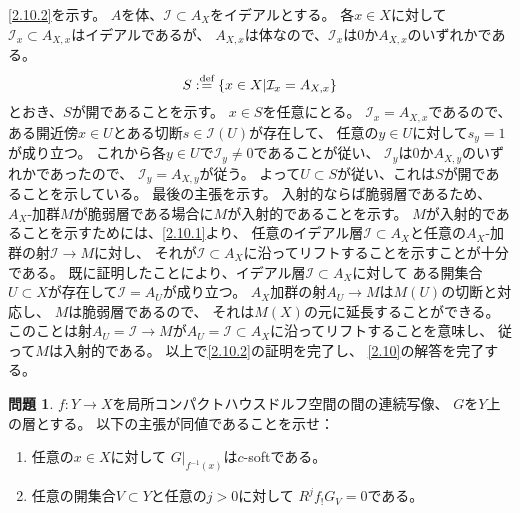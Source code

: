 \documentclass[uplatex,dvipdfmx]{jsarticle}
\makeatletter
\theoremstyle{definition}
\newtheorem{prob}[prob]{問題}
\renewenvironment{proof}[1][\proofname]{
  \pushQED{\qed}%
  \normalfont \topsep6\p@\@plus6\p@\relax
  \trivlist
  \item[\hskip\labelsep
    #1\@addpunct{\textbf{.}}]\ignorespaces
}{%
  \popQED\endtrivlist\@endpefalse
}
\providecommand{\proofname}{証明}
\newcommand\mcI{\mathcal{I}}
\def\dfn{:\overset{\mbox{{\scriptsize def}}}{=}}
\makeatother
\begin{document}
\begin{proof}
  \ref{2.10.2}を示す。
  \(A\)を体、\(\mcI\subset A_X\)をイデアルとする。
  各\(x\in X\)に対して
  \(\mcI_x\subset A_{X,x}\)はイデアルであるが、
  \(A_{X,x}\)は体なので、\(\mcI_x\)は\(0\)か\(A_{X,x}\)のいずれかである。
  \[S\dfn \left\{x\in X\middle| \mcI_x=A_{X,x}\right\}\]
  とおき、\(S\)が開であることを示す。
  \(x\in S\)を任意にとる。
  \(\mcI_x=A_{X,x}\)であるので、
  ある開近傍\(x\in U\)とある切断\(s\in \mcI(U)\)が存在して、
  任意の\(y\in U\)に対して\(s_y = 1\)が成り立つ。
  これから各\(y\in U\)で\(\mcI_y\neq 0\)であることが従い、
  \(\mcI_y\)は\(0\)か\(A_{X,y}\)のいずれかであったので、
  \(\mcI_y = A_{X,y}\)が従う。
  よって\(U\subset S\)が従い、これは\(S\)が開であることを示している。
  最後の主張を示す。
  入射的ならば脆弱層であるため、
  \(A_X\)-加群\(M\)が脆弱層である場合に\(M\)が入射的であることを示す。
  \(M\)が入射的であることを示すためには、\ref{2.10.1}より、
  任意のイデアル層\(\mcI\subset A_X\)と任意の\(A_X\)-加群の射\(\mcI\to M\)に対し、
  それが\(\mcI\subset A_X\)に沿ってリフトすることを示すことが十分である。
  既に証明したことにより、イデアル層\(\mcI\subset A_X\)に対して
  ある開集合\(U\subset X\)が存在して\(\mcI = A_U\)が成り立つ。
  \(A_X\)加群の射\(A_U\to M\)は\(M(U)\)の切断と対応し、
  \(M\)は脆弱層であるので、
  それは\(M(X)\)の元に延長することができる。
  このことは射\(A_U=\mcI\to M\)が\(A_U=\mcI\subset A_X\)に沿ってリフトすることを意味し、
  従って\(M\)は入射的である。
  以上で\ref{2.10.2}の証明を完了し、
  \autoref{2.10}の解答を完了する。
\end{proof}










\begin{prob}\label{2.11}
  \(f:Y\to X\)を局所コンパクトハウスドルフ空間の間の連続写像、
  \(G\)を\(Y\)上の層とする。
  以下の主張が同値であることを示せ：
  \begin{enumerate}
    \item \label{2.11.1}
    任意の\(x\in X\)に対して
    \(G|_{f^{-1}(x)}\)は\(c\)-softである。
    \item \label{2.11.2}
    任意の開集合\(V\subset Y\)と任意の\(j>0\)に対して
    \(R^jf_!G_V=0\)である。
  \end{enumerate}
\end{prob}
\end{document}
